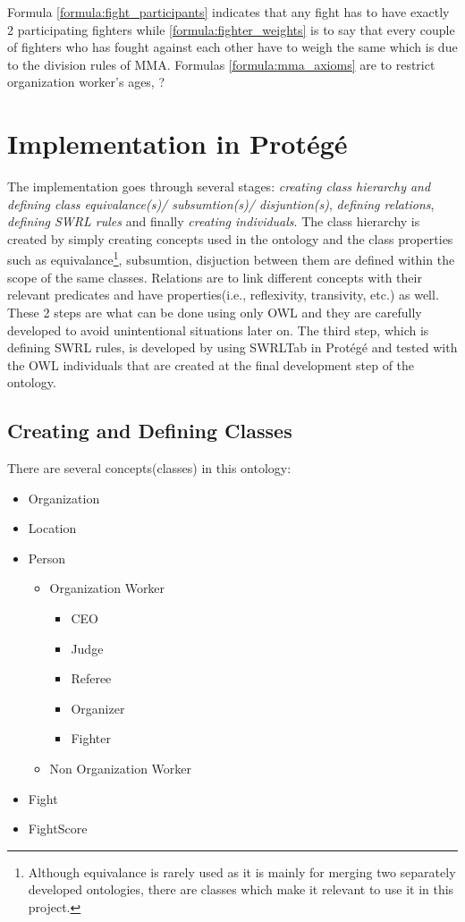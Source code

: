 \documentclass[a4paper]{article}
\begin{document}
Formula \ref{formula:fight_participants} indicates that any fight has to have exactly 2 participating fighters while \ref{formula:fighter_weights} is to say that every couple of fighters 
who has fought against each other have to weigh the same which is due to the division rules of MMA. Formulas \ref{formula:mma_axioms} are to restrict organization worker's ages, ?

\section{Implementation in Prot\'eg\'e}
The implementation goes through several stages: \textit{creating class hierarchy and defining class equivalance(s)/ subsumtion(s)/ disjuntion(s)}, \textit{defining relations}, 
\textit{defining SWRL rules} and finally \textit{creating individuals}. The class hierarchy is created by simply creating concepts used in the ontology and the class properties such as 
equivalance\footnote{Although equivalance is rarely used as it is mainly for merging two separately developed ontologies, there are classes which make it relevant to use it in this project.}, 
subsumtion, disjuction between them are defined within the scope of the same classes. Relations are to link different concepts with their relevant predicates and have properties(i.e., 
reflexivity, transivity, etc.) as well. These 2 steps are what can be done using only OWL and they are carefully developed to avoid unintentional situations later on. The third step, 
which is defining SWRL rules, is developed by using SWRLTab in Prot\'eg\'e and tested with the OWL individuals that are created at the final development step of the ontology.

\subsection{Creating and Defining Classes}
There are several concepts(classes) in this ontology:

\begin{itemize}
	\item Organization
	\item Location
	\item Person
	\begin{itemize}
		\item Organization Worker
		\begin{itemize}
			\item CEO
			\item Judge
			\item Referee
			\item Organizer
			\item Fighter
		\end{itemize}
		\item Non Organization Worker
	\end{itemize}
	\item Fight
	\item FightScore
\end{itemize}
\end{document}
